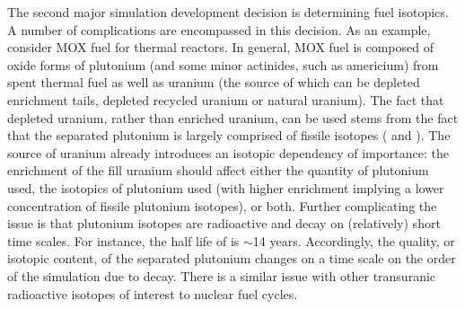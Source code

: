 The second major simulation development decision is determining fuel
isotopics. A number of complications are encompassed in this decision. As an
example, consider MOX fuel for thermal reactors. In general, MOX fuel is
composed of oxide forms of plutonium (and some minor actinides, such as
americium) from spent thermal fuel as well as uranium (the source of which can
be depleted enrichment tails, depleted recycled uranium or natural uranium). The
fact that depleted uranium, rather than enriched uranium, can be used stems from
the fact that the separated plutonium is largely comprised of fissile isotopes
( and ). The source of uranium already introduces an
isotopic dependency of importance: the  enrichment of the fill
uranium should affect either the quantity of plutonium used, the isotopics of
plutonium used (with higher  enrichment implying a lower
concentration of fissile plutonium isotopes), or both. Further complicating the
issue is that plutonium isotopes are radioactive and decay on (relatively) short
time scales. For instance, the half life of  is $\sim$14
years. Accordingly, the quality, or isotopic content, of the separated plutonium
changes on a time scale on the order of the simulation due to decay. There is a
similar issue with other transuranic radioactive isotopes of interest to nuclear
fuel cycles.

